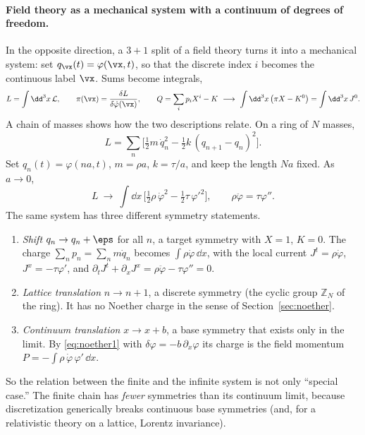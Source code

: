 \paragraph{Field theory as a mechanical system with a continuum of degrees of
freedom.}
In the opposite direction, a $3{+}1$ split of a field theory turns it into a
mechanical system: set $q_{\vx}(t)=\varphi(\vx,t)$, so that the discrete index
$i$ becomes the continuous label $\vx$. Sums become integrals,
\begin{equation}
  L=\int\dd^3x\,\mathcal L,\qquad
  \pi(\vx)=\frac{\delta L}{\delta\dot\varphi(\vx)},\qquad
  Q=\sum_ip_iX^i-K\ \longrightarrow\ \int\dd^3x\,\big(\pi X-K^0\big)=\int\dd^3x\,J^0 .
\end{equation}
A chain of masses shows how the two descriptions relate. On a ring of $N$
masses,
\begin{equation}
  L=\sum_{n}\Big[\tfrac12m\,\dot q_n^2-\tfrac12k\,(q_{n+1}-q_n)^2\Big].
\end{equation}
Set $q_n(t)=\varphi(na,t)$, $m=\rho a$, $k=\tau/a$, and keep the length $Na$
fixed. As $a\to0$,
\begin{equation}
  L\ \to\ \int\dd x\,\Big[\tfrac12\rho\,\dot\varphi^2-\tfrac12\tau\,\varphi'^2\Big],
  \qquad\rho\ddot\varphi=\tau\varphi'' .
\end{equation}
The same system has three different symmetry statements.
\begin{enumerate}[leftmargin=1.8em,itemsep=3pt,label=\textbf{\arabic*.}]
\item \emph{Shift} $q_n\to q_n+\eps$ for all $n$, a target symmetry with $X=1$,
  $K=0$. The charge $\sum_np_n=\sum_nm\dot q_n$ becomes $\int\rho\dot\varphi\,\dd x$,
  with the local current $J^t=\rho\dot\varphi$, $J^x=-\tau\varphi'$, and
  $\partial_tJ^t+\partial_xJ^x=\rho\ddot\varphi-\tau\varphi''=0$.
\item \emph{Lattice translation} $n\to n+1$, a discrete symmetry (the cyclic group
  $\mathbb Z_N$ of the ring). It has no Noether charge in the sense of
  Section~\ref{sec:noether}.
\item \emph{Continuum translation} $x\to x+b$, a base symmetry that exists only
  in the limit. By \eqref{eq:noether1} with $\delta\varphi=-b\,\partial_x\varphi$
  its charge is the field momentum $P=-\int\rho\,\dot\varphi\,\varphi'\,\dd x$.
\end{enumerate}
So the relation between the finite and the infinite system is not only
``special case.'' The finite chain has \emph{fewer} symmetries than its
continuum limit, because discretization generically breaks continuous base
symmetries (and, for a relativistic theory on a lattice, Lorentz invariance).


